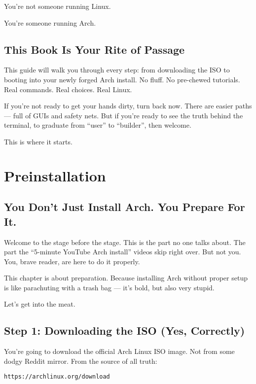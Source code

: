 \documentclass[12pt]{book}
\begin{document}
You’re not someone running Linux.

You’re someone running Arch.

\section*{This Book Is Your Rite of Passage}

This guide will walk you through every step: from downloading the ISO to booting into your newly forged Arch install. No fluff. No pre-chewed tutorials. Real commands. Real choices. Real Linux.

If you're not ready to get your hands dirty, turn back now. There are easier paths — full of GUIs and safety nets. But if you're ready to see the truth behind the terminal, to graduate from “user” to “builder”, then welcome.

This is where it starts.

\clearpage


\chapter{Preinstallation}

\section*{You Don't Just Install Arch. You Prepare For It.}

Welcome to the stage before the stage. This is the part no one talks about. The part the “5-minute YouTube Arch install” videos skip right over. But not you. You, brave reader, are here to do it properly.

This chapter is about preparation. Because installing Arch without proper setup is like parachuting with a trash bag — it's bold, but also very stupid.

Let’s get into the meat.

\section*{Step 1: Downloading the ISO (Yes, Correctly)}

You’re going to download the official Arch Linux ISO image. Not from some dodgy Reddit mirror. From the source of all truth:

\begin{lstlisting}
https://archlinux.org/download
\end{lstlisting}
\end{document}
